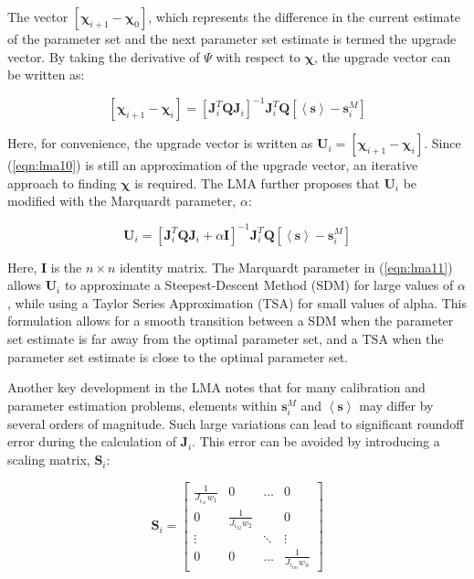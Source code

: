The vector $\left[ \boldsymbol{\chi}_{i+1}-\boldsymbol{\chi}_0 \right]$, which represents the difference in the current estimate of the parameter set and the next parameter set estimate is termed the upgrade vector. By taking the derivative of $\Psi$ with respect to $\boldsymbol{\chi}$, the upgrade vector can be written as:

\begin{equation}
\left[ \boldsymbol{\chi}_{i+1}-\boldsymbol{\chi}_i \right] = \left[\mathbf{J}_i^T\mathbf{Q}\mathbf{J}_i\right]^{-1}\mathbf{J}_i^T\mathbf{Q}\left[\left<\mathbf{s}\right>-\mathbf{s}^M_i\right]
\label{eqn:lma10}
\end{equation}

Here, for convenience, the upgrade vector is written as $\mathbf{U}_{i} = \left[ \boldsymbol{\chi}_{i+1}-\boldsymbol{\chi}_i \right]$. Since (\ref{eqn:lma10}) is still an approximation of the upgrade vector, an iterative approach to finding $\boldsymbol{\chi}$ is required. The LMA further proposes that $\boldsymbol{U}_i$ be modified with the Marquardt parameter, $\alpha$:

\begin{equation}
\mathbf{U}_{i} = \left[\mathbf{J}_i^T\mathbf{Q}\mathbf{J}_i+\alpha\mathbf{I}\right]^{-1}\mathbf{J}_i^T\mathbf{Q}\left[\left<\mathbf{s}\right>-\mathbf{s}^M_i\right]
\label{eqn:lma11}
\end{equation}

Here, $\mathbf{I}$ is the $n\times n$ identity matrix. The Marquardt parameter in (\ref{eqn:lma11}) allows $\mathbf{U}_{i}$ to approximate a Steepest-Descent Method (SDM) for large values of $\alpha$, while using a Taylor Series Approximation (TSA) for small values of alpha. This formulation allows for a smooth transition between a SDM when the parameter set estimate is far away from the optimal parameter set, and a TSA when the parameter set estimate is close to the optimal parameter set.

Another key development in the LMA notes that for many calibration and parameter estimation problems, elements within $\mathbf{s}^M_i$ and $\left<\mathbf{s}\right>$ may differ by several orders of magnitude. Such large variations can lead to significant roundoff error during the calculation of $\mathbf{J}_i$. This error can be avoided by introducing a scaling matrix, $\mathbf{S}_i$:

\begin{equation}
\mathbf{S}_i=\begin{bmatrix}
\frac{1}{J_{i_{11}}w_1} & 0    & \dots  & 0\\ 
0 & \frac{1}{J_{i_{22}}w_2} &        & 0\\ 
\vdots&       & \ddots & \vdots \\ 
0    & 0    & \dots  & \frac{1}{J_{i_{nn}}w_n}
\end{bmatrix}
\label{eqn:lma12}
\end{equation}

